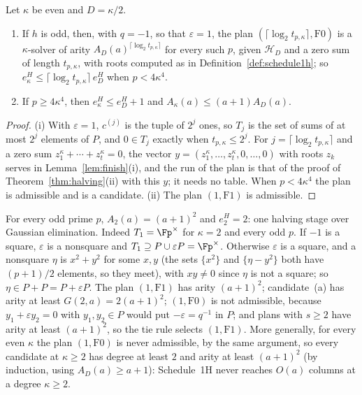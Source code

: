 \begin{corollary}[Halving]
\label{cor:hcd}
Let $\kappa$ be even and $D = \kappa/2$.
\begin{enumerate}[label=\textup{(\roman*)},leftmargin=2em]
  \item If $h$ is odd, then, with $q = -1$, so that $\varepsilon = 1$, the plan $(\lceil\log_2 t_{p,\kappa}\rceil,\mathrm{F0})$ is a $\kappa$-solver of arity $A_D(a)^{\lceil\log_2 t_{p,\kappa}\rceil}$ for every such $p$, given $\mathcal H_D$ and a zero sum of length $t_{p,\kappa}$, with roots computed as in Definition~\ref{def:schedule1h}; so $e^H_\kappa \le \lceil\log_2 t_{p,\kappa}\rceil\,e^H_D$ when $p < 4\kappa^4$.
  \item If $p \ge 4\kappa^4$, then $e^H_\kappa \le e^H_D + 1$ and $A_\kappa(a) \le (a+1)A_D(a)$.
\end{enumerate}
\end{corollary}

\begin{proof}
(i) With $\varepsilon = 1$, $c^{(j)}$ is the tuple of $2^j$ ones, so $T_j$ is the set of sums of at most $2^j$ elements of $P$, and $0 \in T_j$ exactly when $t_{p,\kappa} \le 2^j$. For $j = \lceil\log_2 t_{p,\kappa}\rceil$ and a zero sum $z_1^\kappa+\cdots+z_t^\kappa = 0$, the vector $y = (z_1^\kappa,\dots,z_t^\kappa,0,\dots,0)$ with roots $z_k$ serves in Lemma~\ref{lem:finish}(i), and the run of the plan is that of the proof of Theorem~\ref{thm:halving}(ii) with this $y$; it needs no table. When $p < 4\kappa^4$ the plan is admissible and is a candidate. (ii) The plan $(1,\mathrm{F1})$ is admissible.
\end{proof}

\begin{remark}[The case $\kappa = 2$]
\label{rem:kappa-two}
For every odd prime $p$, $A_2(a) = (a+1)^2$ and $e^H_2 = 2$: one halving stage over Gaussian elimination. Indeed $T_1 = \Fp^\times$ for $\kappa = 2$ and every odd $p$. If $-1$ is a square, $\varepsilon$ is a nonsquare and $T_1 \supseteq P \cup \varepsilon P = \Fp^\times$. Otherwise $\varepsilon$ is a square, and a nonsquare $\eta$ is $x^2 + y^2$ for some $x,y$ (the sets $\{x^2\}$ and $\{\eta - y^2\}$ both have $(p+1)/2$ elements, so they meet), with $xy \ne 0$ since $\eta$ is not a square; so $\eta \in P + P = P + \varepsilon P$. The plan $(1,\mathrm{F1})$ has arity $(a+1)^2$; candidate~(a) has arity at least $G(2,a) = 2(a+1)^2$; $(1,\mathrm{F0})$ is not admissible, because $y_1 + \varepsilon y_2 = 0$ with $y_1,y_2 \in P$ would put $-\varepsilon = q^{-1}$ in $P$; and plans with $s \ge 2$ have arity at least $(a+1)^2$, so the tie rule selects $(1,\mathrm{F1})$. More generally, for every even $\kappa$ the plan $(1,\mathrm{F0})$ is never admissible, by the same argument, so every candidate at $\kappa \ge 2$ has degree at least $2$ and arity at least $(a+1)^2$ (by induction, using $A_D(a) \ge a+1$): Schedule~1H never reaches $O(a)$ columns at a degree $\kappa \ge 2$.
\end{remark}

